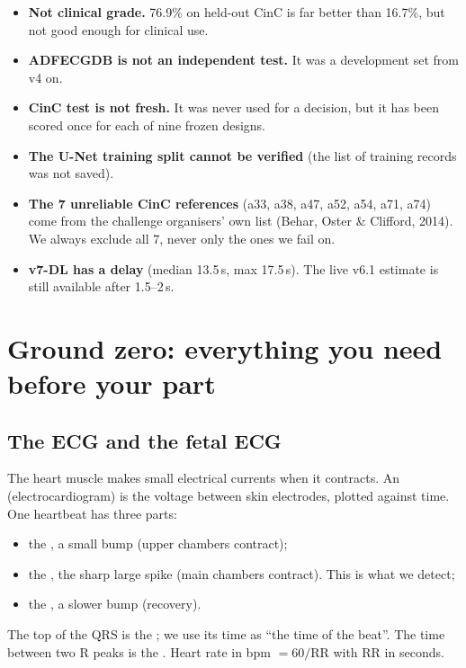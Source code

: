 \documentclass[11pt]{article}
\begin{document}
\begin{warn}
\begin{itemize}
  \item \textbf{Not clinical grade.} 76.9\% on held-out CinC is far better than 16.7\%, but not good enough for clinical use.
  \item \textbf{ADFECGDB is not an independent test.} It was a development set from v4 on.
  \item \textbf{CinC test is not fresh.} It was never used for a decision, but it has been scored once for each of nine frozen designs.
  \item \textbf{The U-Net training split cannot be verified} (the list of training records was not saved).
  \item \textbf{The 7 unreliable CinC references} (a33, a38, a47, a52, a54, a71, a74) come from the challenge organisers' own list (Behar, Oster \& Clifford, 2014). We always exclude all 7, never only the ones we fail on.
  \item \textbf{v7-DL has a delay} (median 13.5\,s, max 17.5\,s). The live v6.1 estimate is still available after 1.5--2\,s.
\end{itemize}
\end{warn}

\newpage
\section{Ground zero: everything you need before your part}
\label{sec:basics}

\subsection{The ECG and the fetal ECG}
The heart muscle makes small electrical currents when it contracts. An  (electrocardiogram) is the voltage between skin electrodes, plotted against time. One heartbeat has three parts:
\begin{itemize}
  \item the , a small bump (upper chambers contract);
  \item the , the sharp large spike (main chambers contract). This is what we detect;
  \item the , a slower bump (recovery).
\end{itemize}
The top of the QRS is the ; we use its time as ``the time of the beat''. The time between two R peaks is the . Heart rate in bpm $= 60/\text{RR}$ with RR in seconds.
\end{document}
